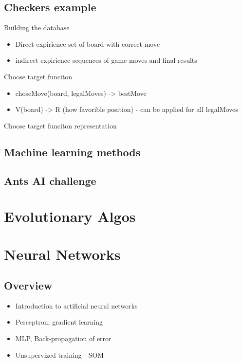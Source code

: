 \documentclass[12pt, letterpaper]{article}
\begin{document}
\subsection*{Checkers example}

Building the database
\begin{itemize}
    \item Direct expirience
    \subitem set of board with correct move
    \item indirect expirience
    \subitem sequences of game moves and final results
\end{itemize}

Choose target funciton
\begin{itemize}
    \item choseMove(board, legalMoves) -> bestMove
    \item V(board) -> R (how favorible position) - can be applied for all legalMoves
\end{itemize}

Choose target funciton representation

\subsection*{Machine learning methods}

\subsection*{Ants AI challenge}

\section{Evolutionary Algos}

\subsection*{}


\section{Neural Networks}

\subsection*{Overview}
\begin{itemize}
    \item Introduction to artificial neural networks
    \item Perceptron, gradient learning
    \item MLP, Back-propagation of error
    \item Unsupervized training - SOM
\end{itemize}
\end{document}
